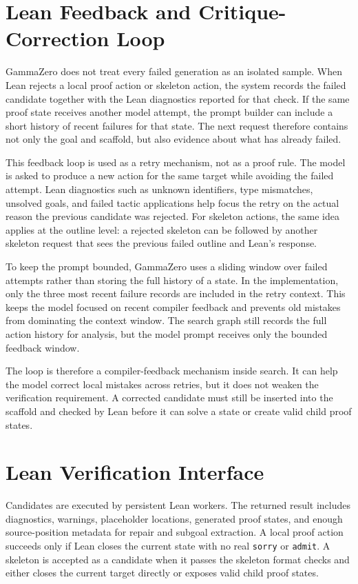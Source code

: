 \documentclass[en]{uet_awesome_thesis/uet-awesome-thesis}
\begin{document}
\section{Lean Feedback and Critique-Correction Loop}
\label{subsec:lean-feedback}

GammaZero does not treat every failed generation as an isolated sample. When Lean rejects a local proof
action or skeleton action, the system records the failed candidate together with the Lean diagnostics
reported for that check. If the same proof state receives another model attempt, the prompt builder can
include a short history of recent failures for that state. The next request therefore contains not only the
goal and scaffold, but also evidence about what has already failed.

This feedback loop is used as a retry mechanism, not as a proof rule. The model is asked to produce a
new action for the same target while avoiding the failed attempt. Lean diagnostics such as unknown
identifiers, type mismatches, unsolved goals, and failed tactic applications help focus the retry on the
actual reason the previous candidate was rejected. For skeleton actions, the same idea applies at the
outline level: a rejected skeleton can be followed by another skeleton request that sees the previous
failed outline and Lean's response.

To keep the prompt bounded, GammaZero uses a sliding window over failed attempts rather than storing
the full history of a state. In the implementation, only the three most recent failure records are included
in the retry context. This keeps the model focused on recent compiler feedback and prevents old
mistakes from dominating the context window. The search graph still records the full action history for
analysis, but the model prompt receives only the bounded feedback window.

The loop is therefore a compiler-feedback mechanism inside search. It can help the model correct local
mistakes across retries, but it does not weaken the verification requirement. A corrected candidate must
still be inserted into the scaffold and checked by Lean before it can solve a state or create valid child
proof states.

\section{Lean Verification Interface}

Candidates are executed by persistent Lean workers. The returned result includes diagnostics, warnings, placeholder locations, generated proof states, and enough source-position metadata for repair and subgoal extraction. A local proof action succeeds only if Lean closes the current state with no real \texttt{sorry} or \texttt{admit}. A skeleton is accepted as a candidate when it passes the skeleton format checks and either closes the current target directly or exposes valid child proof states.
\end{document}
